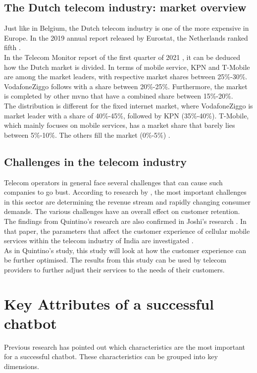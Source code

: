 \subsection{The Dutch telecom industry: market overview}
Just like in Belgium, the Dutch telecom industry is one of the more expensive in Europe. In the 2019 annual report released by Eurostat, the Netherlands ranked fifth \citep{Eurostat2020}.\\
In the Telecom Monitor report of the first quarter of 2021 \citep{Acm2021}, it can be deduced how the Dutch market is divided. In terms of mobile service, KPN and T-Mobile are among the market leaders, with respective market shares between 25\%-30\%. VodafoneZiggo follows with a share between 20\%-25\%. Furthermore, the market is completed by other \acrfull{mvno} that have a combined share between 15\%-20\%. \citep{Acm2021}\\
The distribution is different for the fixed internet market, where VodafoneZiggo is market leader with a share of 40\%-45\%, followed by KPN (35\%-40\%). T-Mobile, which mainly focuses on mobile services, has a market share that barely lies between 5\%-10\%. The others fill the market (0\%-5\%) \citep{Acm2021}.

\subsection{Challenges in the telecom industry}
Telecom operators in general face several challenges that can cause such companies to go bust. According to research by \citeauthor{Quintino2019}, the most important challenges in this sector are determining the revenue stream and rapidly changing consumer demands. The various challenges have an overall effect on customer retention. The findings from Quintino's research are also confirmed in Joshi's research \citep{Joshi2014}. In that paper, the parameters that affect the customer experience of cellular mobile services within the telecom industry of India are investigated \citep{Joshi2014, Malviya2012, Quintino2019}.\\
As in Quintino's study, this study will look at how the customer experience can be further optimised. The results from this study can be used by telecom providers to further adjust their services to the needs of their customers.

\section{Key Attributes of a successful chatbot}
Previous research \citep{Muizzah2021, Verkeyn2018} has pointed out which characteristics are the most important for a successful chatbot. These characteristics can be grouped into key dimensions.

